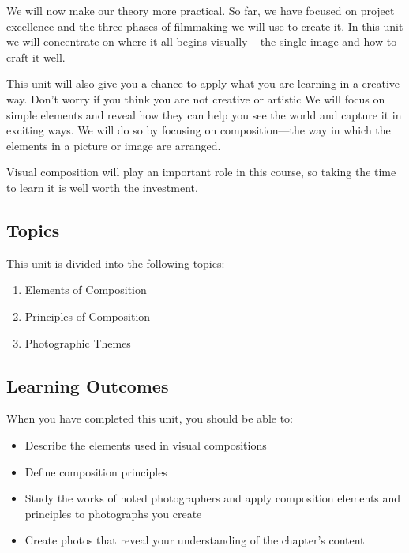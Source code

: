 \documentclass[
]{book}
\providecommand{\tightlist}{%
  \setlength{\itemsep}{0pt}\setlength{\parskip}{0pt}}
\begin{document}
We will now make our theory more practical. So far, we have focused on project excellence and the three phases of filmmaking we will use to create it. In this unit we will concentrate on where it all begins visually -- the single image and how to craft it well.

This unit will also give you a chance to apply what you are learning in a creative way. Don't worry if you think you are not creative or artistic We will focus on simple elements and reveal how they can help you see the world and capture it in exciting ways. We will do so by focusing on composition---the way in which the elements in a picture or image are arranged.

Visual composition will play an important role in this course, so taking the time to learn it is well worth the investment.

\hypertarget{topics-2}{%
\subsection{Topics}\label{topics-2}}

This unit is divided into the following topics:

\begin{enumerate}
\def\labelenumi{\arabic{enumi}.}
\tightlist
\item
  Elements of Composition\\
\item
  Principles of Composition\\
\item
  Photographic Themes
\end{enumerate}

\hypertarget{learning-outcomes-2}{%
\subsection*{Learning Outcomes}\label{learning-outcomes-2}}

When you have completed this unit, you should be able to:

\begin{itemize}
\tightlist
\item
  Describe the elements used in visual compositions\\
\item
  Define composition principles\\
\item
  Study the works of noted photographers and apply composition elements and principles to photographs you create\\
\item
  Create photos that reveal your understanding of the chapter's content
\end{itemize}
\end{document}
